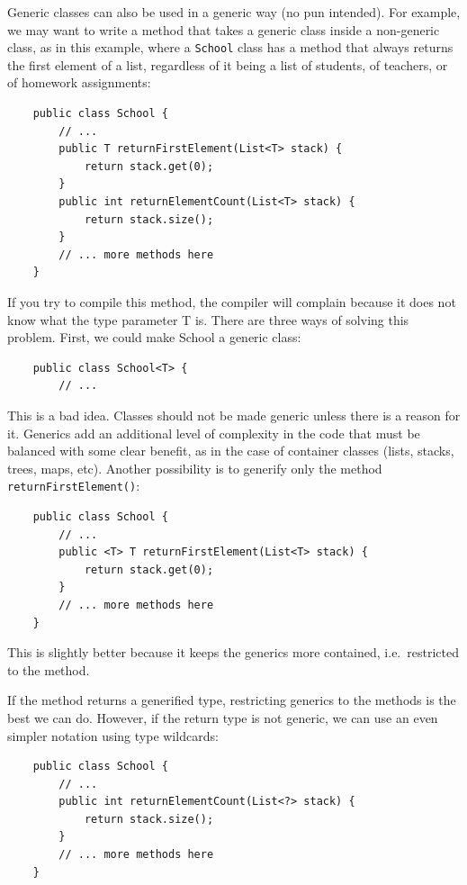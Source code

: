 Generic classes can also be used in a generic way (no pun
intended). For example, we may want to write a method that takes a
generic class inside a non-generic class, as in this example, where a
\verb+School+ class has a method that always returns the first element
of a list, regardless of it being a list of students, of teachers, or of
homework assignments: 

\begin{verbatim}
    public class School {
        // ...
        public T returnFirstElement(List<T> stack) {
            return stack.get(0); 
        }
        public int returnElementCount(List<T> stack) {
            return stack.size();
        }
        // ... more methods here
    }
\end{verbatim}

If you try to compile this method, the compiler will complain because
it does not know what the type parameter T is. There are three ways of
solving this problem. First, we could make School a generic class: 

\begin{verbatim}
    public class School<T> {
        // ...
\end{verbatim}

This is a bad idea. Classes should not be made generic unless there is
a reason for it. Generics add an additional level of complexity in the
code that must be balanced with some clear benefit, as in the case of
container classes (lists, stacks, trees, maps, etc). Another
possibility is to generify only the method
\verb+returnFirstElement()+: 

\begin{verbatim}
    public class School {
        // ...
        public <T> T returnFirstElement(List<T> stack) {
            return stack.get(0); 
        }
        // ... more methods here
    }
\end{verbatim}

This is slightly better because it keeps the generics more
contained, i.e.~restricted to the method. 

If the method returns a generified type, restricting generics to the
methods is the best
we can do. However, if the return type is not generic, 
we can use an even simpler notation using type wildcards: 

\begin{verbatim}
    public class School {
        // ...
        public int returnElementCount(List<?> stack) {
            return stack.size();
        }
        // ... more methods here
    }
\end{verbatim}

